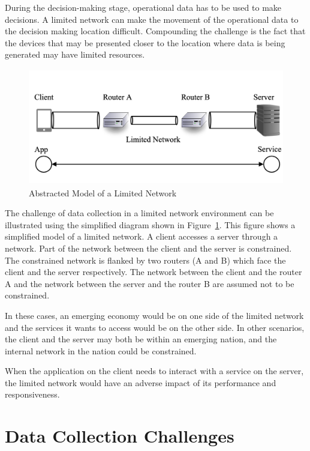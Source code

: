 During the decision-making stage, operational data has to be used to make decisions. A limited network can make the movement of the operational data to the decision making location difficult. Compounding the challenge is the fact that the devices that may be presented closer to the location where data is being generated may have limited resources. 

\begin{figure}[htbp]
\centering
\includegraphics[height=2in] {chapters/chap_net_limited/chap_net_figures/fig1.png}
\caption{Abstracted Model of a Limited Network}
\label{fig:chap_net:ov}
\end{figure}

The challenge of data collection in a limited network environment can be illustrated using the simplified diagram shown in Figure~\ref{fig:chap_net:ov}. This figure shows a simplified model of a limited network. A client accesses a server through a network. Part of the network between the client and the server is constrained. The constrained network is flanked by two routers (A and B) which face the client and the server respectively. The network between the client and the router A and the network between the server and the router B are assumed not to be constrained. 

In these cases, an emerging economy would be on one side of the limited network and the services it wants to access would be on the other side. In other scenarios, the  client and the server may both be within an emerging nation, and the internal network in the nation could be constrained. 

When the application on the client needs to interact with a service on the server, the limited network would have an adverse impact of its performance and responsiveness. 

\section{Data Collection Challenges}
\label{sec:limited_network:collection}

